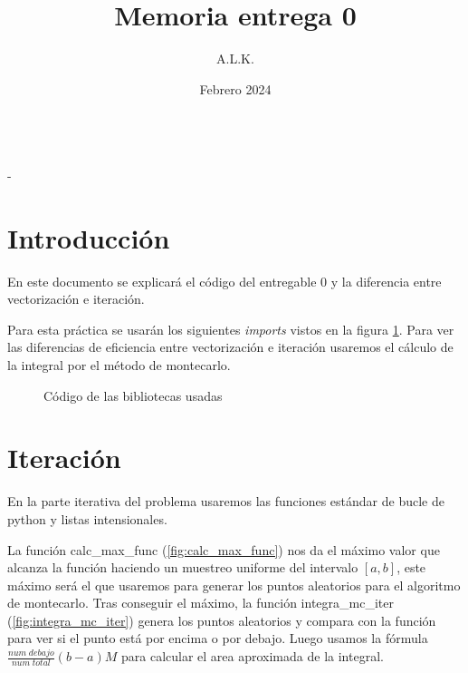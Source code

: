 \documentclass[6pt]{AiTex}
\title{Memoria entrega 0}
\author{A.L.K.}
\date{Febrero 2024}
\begin{document}
\justify

\begin{center}

    {\huge \textbf{\underline{\subtitulo}}} \\
    { \lesson - \autor}

\end{center}


\section*{Introducción}

En este documento se explicará el código del entregable 0 y la diferencia entre vectorización e iteración.

Para esta práctica se usarán los siguientes \textit{imports} vistos en la figura \ref{fig:imports}. Para ver las diferencias de eficiencia entre vectorización e iteración usaremos el cálculo de la integral por el método de montecarlo.
\begin{figure}[H]
    \centering
    
    \caption{Código de las bibliotecas usadas}
    \label{fig:imports}
\end{figure}

\section{Iteración}

En la parte iterativa del problema usaremos las funciones estándar de bucle de python y listas intensionales.

La función \textcolor{codepurple}{calc\_max\_func} (\ref{fig:calc_max_func}) nos da el máximo valor que alcanza la función haciendo un muestreo uniforme del intervalo $[a,b]$, este máximo será el que usaremos para generar los puntos aleatorios para el algoritmo de montecarlo.
Tras conseguir el máximo, la función \textcolor{codepurple}{integra\_mc\_iter} (\ref{fig:integra_mc_iter}) genera los puntos aleatorios y compara con la función para ver si el punto está por encima o por debajo. Luego usamos la fórmula $\frac{num\;debajo}{num\;total}(b-a)M$ para calcular el area aproximada de la integral.
\end{document}
